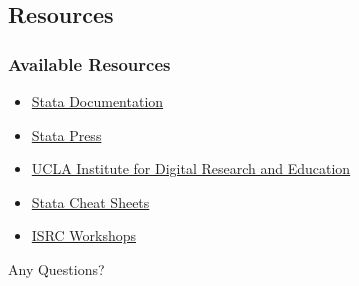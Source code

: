 \documentclass{beamer}
\begin{document}
\subsection{Resources}

\begin{frame}
	\frametitle{Available Resources}
		\begin{itemize}
			\item \href{http://www.stata-press.com/manuals/documentation-set/}{Stata Documentation}
			\item \href{http://www.stata-press.com/}{Stata Press}
			\item \href{https://stats.idre.ucla.edu/stata/}{UCLA Institute for Digital Research and Education}
			\item \href{http://www.stata.com/contactadmin/link.php?M=6471092&N=1178&L=1430&F=H}{Stata Cheat Sheets}
			\item \href{http://ppc.uiowa.edu/isrc/workshops}{ISRC Workshops}
		\end{itemize}
\end{frame}

\begin{frame}
	\begin{center}
		\begin{LARGE}
			Any Questions?
		\end{LARGE}
	\end{center}
\end{frame}
\end{document}
